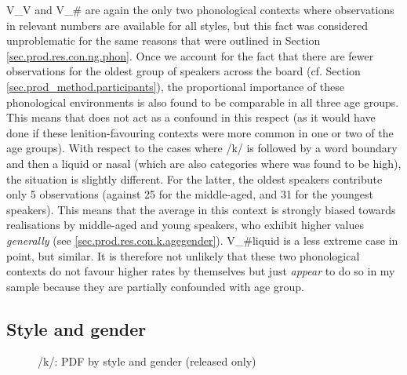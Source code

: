 V\_V and V\_\# are again the only two phonological contexts where observations in relevant numbers are available for all styles, but this fact was considered unproblematic for the same reasons that were outlined in Section \ref{sec.prod.res.con.ng.phon}.
Once we account for the fact that there are fewer observations for the oldest group of speakers across the board (cf. Section \ref{sec.prod_method.participants}), the proportional importance of these phonological environments is also found to be comparable in all three age groups.
This means that  does not act as a confound in this respect (as it would have done if these lenition-favouring contexts were more common in one or two of the age groups).
With respect to the cases where /k/ is followed by a word boundary and then a liquid or nasal (which are also categories where  was found to be high), the situation is slightly different.
For the latter, the oldest speakers contribute only 5 observations (against 25 for the middle-aged, and 31 for the youngest speakers).
This means that the average  in this context is strongly biased towards realisations by middle-aged and young speakers, who exhibit higher  values \emph{generally} (see \ref{sec.prod.res.con.k.agegender}).
V\_\#liquid is a less extreme case in point, but similar.
It is therefore not unlikely that these two phonological contexts do not favour higher  rates by themselves but just \emph{appear} to do so in my sample because they are partially confounded with age group.

\subsection{Style and gender}
\label{sec.prod.res.con.k.stylegender}

\begin{figure}[h]
	\centering
		\resizebox{.49\linewidth}{!}{} 
	\caption{/k/: PDF by style and gender (released only)}
	\label{fig.box.k.stylegender}
\end{figure}


